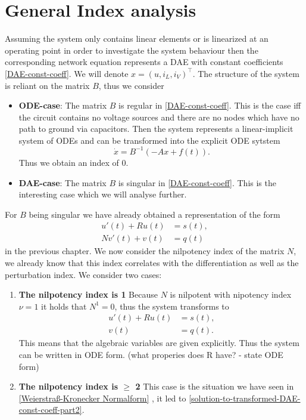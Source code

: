 \section{General Index analysis}

Assuming the system only contains linear elements or is linearized at an operating point in order to investigate the system behaviour then the corresponding network equation represents a DAE with constant coefficients \ref{DAE-const-coeff}. We will denote $x=(u, i_L, i_V)^\top$. The structure of the system is reliant on the matrix $B$, thus we consider

\begin{itemize}
	\item \textbf{ODE-case}: \newline
	The matrix $B$ is regular in \ref{DAE-const-coeff}. This is the case iff the circuit contains no voltage sources and there are no nodes which have no path to ground via capacitors. Then the system represents a linear-implicit system of ODEs and can be transformed into the explicit ODE sytstem
	\begin{displaymath}
		\dot{x}=B^{-1}(-Ax+f(t)).
	\end{displaymath}
	Thus we obtain an index of $0$.
		
	\item \textbf{DAE-case}:
	The matrix $B$ is singular in \ref{DAE-const-coeff}. This is the interesting case which we will analyse further.
\end{itemize}

For $B$ being singular we have already obtained a representation of the form
\begin{align*}
	u'(t) + Ru(t) &= s(t), \\
	Nv'(t) + v(t) &= q(t)
\end{align*}
in the previous chapter. We now consider the nilpotency index of the matrix $N$, we already know that this index correlates with the differentiation as well as the perturbation index. We consider two cases:

\begin{enumerate}
	\item \textbf{The nilpotency index is 1} \newline
		Because $N$ is nilpotent with nipotency index $\nu = 1$ it holds that $N^1 = 0$, thus the system transforms to
		\begin{align*}
			u'(t) + Ru(t) &= s(t), \\
			v(t) &= q(t).
		\end{align*}
		This means that the algebraic variables are given explicitly. Thus the system can be written in ODE form. (what properies does R have? - state ODE form)

	\item \textbf{The nilpotency index is $\geq$ 2} \newline
		This case is the situation we have seen in \ref{Weierstraß-Kronecker Normalform} , it led to \ref{solution-to-transformed-DAE-const-coeff-part2}.

\end{enumerate}

